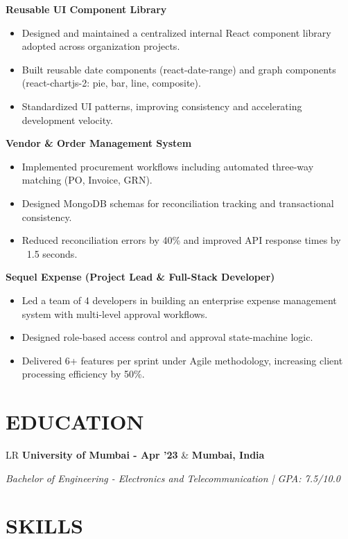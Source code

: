 \documentclass[10pt,a4paper]{moderncv}
\newcommand*{\educationentry}[3]{
    \begin{tabularx}{\textwidth}{LR}
        {\bfseries #1} & {\bfseries #2} \\
    \end{tabularx}
    {\itshape #3}
}
\begin{document}
\textbf{Reusable UI Component Library}
\begin{itemize}
    \item Designed and maintained a centralized internal React component library adopted across organization projects.
    \item Built reusable date components (react-date-range) and graph components (react-chartjs-2: pie, bar, line, composite).
    \item Standardized UI patterns, improving consistency and accelerating development velocity.
\end{itemize}

\textbf{Vendor \& Order Management System}
\begin{itemize}
    \item Implemented procurement workflows including automated three-way matching (PO, Invoice, GRN).
    \item Designed MongoDB schemas for reconciliation tracking and transactional consistency.
    \item Reduced reconciliation errors by 40\% and improved API response times by ~1.5 seconds.
\end{itemize}

\textbf{Sequel Expense (Project Lead \& Full-Stack Developer)}
\begin{itemize}
    \item Led a team of 4 developers in building an enterprise expense management system with multi-level approval workflows.
    \item Designed role-based access control and approval state-machine logic.
    \item Delivered 6+ features per sprint under Agile methodology, increasing client processing efficiency by 50\%.
\end{itemize}

\section{EDUCATION}

\educationentry
{University of Mumbai - Apr '23}
{Mumbai, India}
{Bachelor of Engineering - Electronics and Telecommunication \quad | \quad GPA: 7.5/10.0}

\section{SKILLS}
\end{document}
